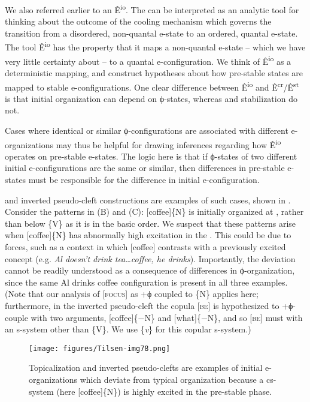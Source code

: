   We also referred earlier to an  Ê\textsuperscript{io}. The  can be interpreted as an analytic tool for thinking about the outcome of the cooling mechanism which governs the transition from a disordered, non-quantal e-state to an ordered, quantal e-state. The tool Ê\textsuperscript{io} has the property that it maps a non-quantal e-state -- which we have very little certainty about -- to a quantal e-con\-fig\-u\-ra\-tion. We think of Ê\textsuperscript{io} as a deterministic mapping, and construct hypotheses about how pre-stable states are mapped to stable e-con\-fig\-u\-ra\-tions. One clear difference between Ê\textsuperscript{io} and Ê\textsuperscript{cr}/Ê\textsuperscript{st} is that initial organization can depend on ϕ-states, whereas  and stabilization do not. 

  Cases where identical or similar ϕ-con\-fig\-u\-ra\-tions are associated with different e-organizations may thus be helpful for drawing inferences regarding how Ê\textsuperscript{io} operates on pre-stable e-states. The logic here is that if ϕ-states of two different initial e-con\-fig\-u\-ra\-tions are the same or similar, then differences in pre-stable e-states must be responsible for the difference in initial e-con\-fig\-u\-ra\-tion. 

   and inverted pseudo-cleft constructions are examples of such cases, shown in {}. Consider the patterns in (B) and (C): [coffee]\{N\} is initially organized at , rather than below \{V\} as it is in the basic order. We suspect that these patterns arise when [coffee]\{N\} has abnormally high excitation in the . This could be due to  forces, such as a context in which [coffee] contrasts with a previously excited concept (e.g. \textit{Al doesn't drink tea…coffee, he drinks}). Importantly, the deviation cannot be readily understood as a consequence of differences in ϕ-organization, since the same {\textbar}Al drinks coffee{\textbar} configuration is present in all three examples. (Note that our analysis of [\textsc{focus}] as +ϕ coupled to \{N\} applies here; furthermore, in the inverted pseudo-cleft the copula [\textsc{be}] is hypothesized to +ϕ-couple with two arguments, [coffee]\{−N\} and [what]\{−N\}, and so [\textsc{be}] must  with an s-system other than \{V\}. We use \{\textit{v}\} for this copular s-system.)

  
\begin{figure}
\texttt{[image: figures/Tilsen-img78.png]}
\caption{Topicalization and inverted pseudo-clefts are examples of initial e-organizations which deviate from typical organization because a cs-system (here [coffee]\{N\}) is highly excited in the pre-stable phase.}
\label{fig:4:28}
\end{figure}
 

